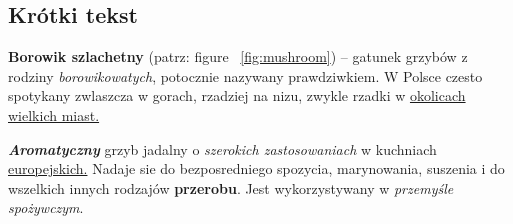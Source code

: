 \begin{flushleft}
\subsection{Krótki tekst}
\hspace{0.5 in} \textbf{Borowik szlachetny} (patrz: figure ~\ref{fig:mushroom}) – gatunek grzybów z rodziny 
\textit{borowikowatych}, potocznie nazywany prawdziwkiem.
W Polsce czesto spotykany zwlaszcza w gorach, rzadziej na nizu,
zwykle rzadki w \underline{okolicach wielkich miast.}\par
\hspace{0.5 in} 
\textbf{\textit{Aromatyczny}} grzyb jadalny o \textit{szerokich zastosowaniach}
w kuchniach \underline{europejskich.} 
Nadaje sie do bezposredniego spozycia, marynowania,
suszenia i do wszelkich innych rodzajów \textbf{przerobu}. 
Jest wykorzystywany w \textit{przemyśle spożywczym}.
\end{flushleft}